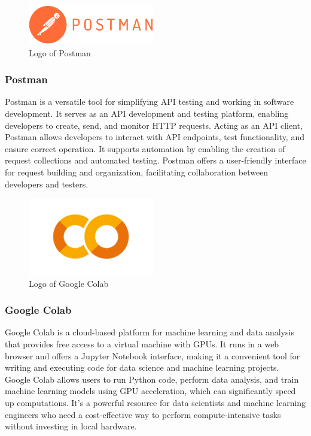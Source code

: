 \documentclass[conference]{IEEEtran}
\begin{document}
        \begin{figure}[htbp]
        \centerline{\includegraphics[width=5.5cm]{Images/logo/postman.png}}
        \label{fig}
        \caption{Logo of Postman}
        \end{figure}
        \subsubsection{Postman}
        Postman is a versatile tool for simplifying API testing and working in software development. It serves as an API development and testing platform, enabling developers to create, send, and monitor HTTP requests. Acting as an API client, Postman allows developers to interact with API endpoints, test functionality, and ensure correct operation. It supports automation by enabling the creation of request collections and automated testing. Postman offers a user-friendly interface for request building and organization, facilitating collaboration between developers and testers.\\

        \begin{figure}[htbp]
        \centerline{\includegraphics[width=5.5cm]{Images/logo/colab.png}}
        \label{fig}
        \caption{Logo of Google Colab}
        \end{figure}
        \subsubsection{Google Colab}
        Google Colab is a cloud-based platform for machine learning and data analysis that provides free access to a virtual machine with GPUs. It runs in a web browser and offers a Jupyter Notebook interface, making it a convenient tool for writing and executing code for data science and machine learning projects. Google Colab allows users to run Python code, perform data analysis, and train machine learning models using GPU acceleration, which can significantly speed up computations. It's a powerful resource for data scientists and machine learning engineers who need a cost-effective way to perform compute-intensive tasks without investing in local hardware.\\
\end{document}
